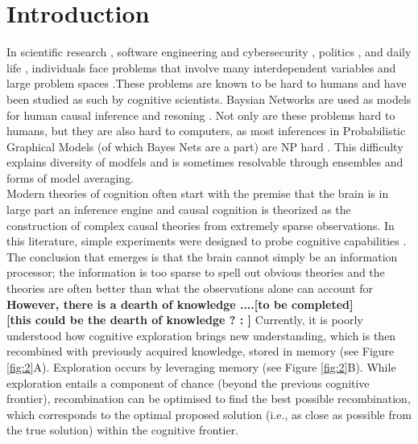 \section{Introduction}
In scientific research \cite{hisano2013challenges}, software engineering and cybersecurity \cite{littlewood1989predicting,maillart2017given}, politics \cite{clinton2014hard}, and daily life \cite{gerson1986hard}, individuals face problems that involve many interdependent variables and large problem spaces \cite{koller09, Pearl2009CMR}.These problems are known to be hard to humans and have been studied as such by cognitive scientists. Baysian Networks are used as models for human causal inference and resoning \cite{bramley2015staying, castnerForthcoming, Griffiths2008, Pearl88, Spiegler2016, spiegler2015}. Not only are these problems hard to humans, but they are also hard to computers, as most inferences in Probabilistic Graphical Models (of which Bayes Nets are a part) are NP hard \cite{koller09}. This difficulty explains diversity of modfels and is sometimes resolvable through ensembles and forms of model averaging.\\ 

Modern theories of cognition often start with the premise that the brain is in large part an inference engine \cite{Tenenbaum06theory-basedbayesian} and causal cognition is theorized as the construction of complex causal theories from extremely sparse observations. In this literature, simple experiments were designed to probe cognitive capabilities \cite{tenenbaum2001structure}. The conclusion that emerges is that the brain cannot simply be an information processor; the information is too sparse to spell out obvious theories and the theories are often better than what the observations alone can account for \cite{ortoleva2012modeling, Hong04} \\

{\bf However, there is a dearth of knowledge ....[to be completed]}\\

{\bf [this could be the dearth of knowledge ? : ]} Currently, it is poorly understood how cognitive exploration brings new understanding, which is then recombined with previously acquired knowledge, stored in memory (see Figure \ref{fig:2}A). Exploration occurs by leveraging memory (see Figure \ref{fig:2}B). While exploration entails a component of chance (beyond the previous cognitive frontier), recombination can be optimised to find the best possible recombination, which corresponds to the optimal proposed solution (i.e., as close as possible from the true solution) within the cognitive frontier.\\

